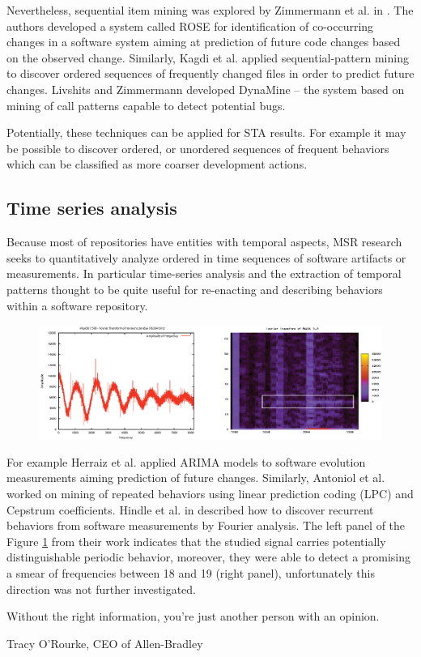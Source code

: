 Nevertheless, sequential item mining was explored by Zimmermann et al. in \cite{citeulike:277045}. 
The authors developed a system called ROSE for identification of co-occurring changes in a software system aiming at 
prediction of future code changes based on the observed change. 
Similarly, Kagdi et al. \cite{citeulike:3929070} applied sequential-pattern mining to discover ordered sequences of 
frequently changed files in order to predict future changes. 
Livshits and Zimmermann \cite{citeulike:393158} developed DynaMine -- the system based on mining of call patterns 
capable to detect potential bugs.

Potentially, these techniques can be applied for STA results. For example it may be possible to discover ordered, or
unordered sequences of frequent behaviors which can be classified as more coarser development actions.

\subsection{Time series analysis}\label{chapter2_section-tsanalysis}
Because most of repositories have entities with temporal aspects, MSR research seeks to quantitatively analyze ordered 
in time sequences of software artifacts or measurements. In particular time-series analysis and the extraction of 
temporal patterns thought to be quite useful for re-enacting and describing behaviors within a software repository. 

\begin{figure}[t!]
   \centering
   \includegraphics[width=145mm]{figures/FourrierMySQL.eps}
   \caption{}
   \label{fig:mysql-fourrier}
\end{figure}

For example Herraiz et al. \cite{citeulike:6544685} applied ARIMA models to software evolution measurements aiming 
prediction of future changes. 
Similarly, Antoniol et al. \cite{citeulike:3378725} worked on mining of repeated behaviors using linear prediction 
coding (LPC) and Cepstrum coefficients. 
Hindle et al. in \cite{citeulike:10377345} described how to discover recurrent behaviors from software measurements 
by Fourier analysis. The left panel of the Figure \ref{fig:mysql-fourrier} from their work indicates that the studied 
signal carries potentially distinguishable periodic behavior, moreover, they were able to detect a promising a smear 
of frequencies between 18 and 19 (right panel), unfortunately this direction was not further investigated.


\epigraph{Without the right information, you're just another person with an opinion.}{Tracy O'Rourke, CEO of Allen-Bradley}